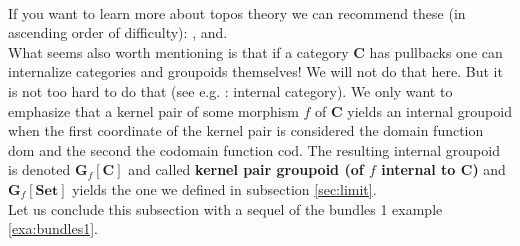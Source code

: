 \\
If you want to learn more about topos theory we can recommend these (in ascending order of difficulty): \cite{de9b9402}, \cite{c55c71e8} and\cite{c1f00dad}.
\\
What seems also worth mentioning is that if a category $\mathbf{C}$ has pullbacks one can internalize categories and groupoids themselves! We will not do that here. But it is not too hard to do that (see e.g. \cite{wiki-nlab0000}: internal category). We only want to emphasize that a kernel pair of some morphism $f$ of $\mathbf{C}$ yields an internal groupoid when the first coordinate of the kernel pair is considered the domain function $\mathrm{dom}$ and the second the codomain function $\mathrm{cod}$. The resulting internal groupoid is denoted $\mathbf{G}_{f}[\mathbf{C}]$ and called \textbf{kernel pair groupoid (of $f$ internal to $\mathbf{C}$)} and $\mathbf{G}_{f}[\mathbf{Set}]$ yields the one we defined in subsection \ref{sec:limit}.
\\
Let us conclude this subsection with a sequel of the bundles 1 example \ref{exa:bundles1}.
\\
